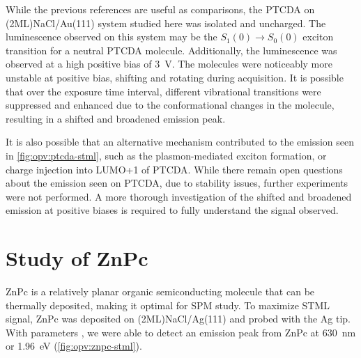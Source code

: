 While the previous references are useful as comparisons, the PTCDA on (2ML)NaCl/Au(111) system studied here was isolated and uncharged. The luminescence observed on this system may be the $S_1(0) \rightarrow S_0(0)$ exciton transition for a neutral PTCDA molecule. Additionally, the luminescence was observed at a high positive bias of \SI{3}{V}. The molecules were noticeably more unstable at positive bias, shifting and rotating during acquisition. It is possible that over the exposure time interval, different vibrational transitions were suppressed and enhanced due to the conformational changes in the molecule, resulting in a shifted and broadened emission peak. 

It is also possible that an alternative mechanism contributed to the emission seen in \autoref{fig:opv:ptcda-stml}, such as the plasmon-mediated exciton formation, or charge injection into LUMO+1 of PTCDA. While there remain open questions about the emission seen on PTCDA, due to stability issues, further experiments were not performed. A more thorough investigation of the shifted and broadened emission at positive biases is required to fully understand the signal observed.



\section{Study of {ZnPc}}

\ac{ZnPc} is a relatively planar organic semiconducting molecule that can be thermally deposited, making it optimal for \ac{SPM} study. To maximize \ac{STML} signal, ZnPc was deposited on (2ML)NaCl/Ag(111) and probed with the Ag tip. With parameters , we were able to detect an emission peak from ZnPc at \SI{630}{nm} or \SI{1.96}{eV} (\autoref{fig:opv:znpc-stml}).




